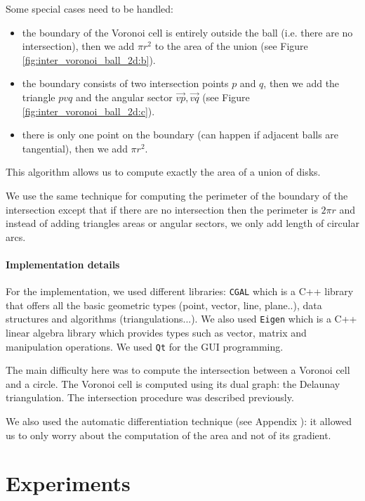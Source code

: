 Some special cases need to be handled:
\begin{itemize}
    \item the boundary of the Voronoi cell is entirely outside the ball (i.e.
        there are no intersection), then we add $ \pi r^2 $ to the area of the
        union (see Figure \ref{fig:inter_voronoi_ball_2d:b}).
    \item the boundary consists of two intersection points $ p $ and $ q $, then
        we add the triangle $ pvq $ and the angular sector $ \vec{vp}, \vec{vq}
        $ (see Figure \ref{fig:inter_voronoi_ball_2d:c}).
    \item there is only one point on the boundary (can happen if adjacent balls
        are tangential), then we add $ \pi r^2 $.
\end{itemize}

This algorithm allows us to compute exactly the area of a union of disks.

We use the same technique for computing the perimeter of the boundary of the
intersection except that if there are no intersection then the perimeter is $ 2
\pi r $ and instead of adding triangles areas or angular sectors, we only add
length of circular arcs.

\paragraph{Implementation details}

For the implementation, we used different libraries: \texttt{CGAL} which is a
C++ library that offers all the basic geometric types (point, vector, line,
plane..), data structures and algorithms (triangulations...). We also used
\texttt{Eigen} which is a C++ linear algebra library which provides types such
as vector, matrix and manipulation operations. We used \texttt{Qt} for the GUI
programming.

The main difficulty here was to compute the intersection between a Voronoi cell
and a circle. The Voronoi cell is computed using its dual graph: the Delaunay
triangulation. The intersection procedure was described previously.

We also used the automatic differentiation technique (see Appendix
): it allowed us to only worry about the computation of the
area and not of its gradient.

\section{Experiments}

